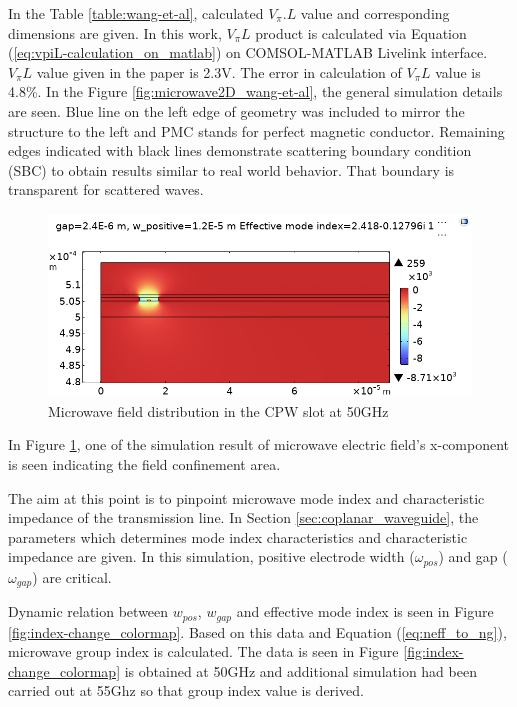     In the Table \ref{table:wang-et-al}, calculated $V_{\pi}.L$ value and corresponding dimensions are given. In this work, $V_\pi L$ product is calculated via Equation (\ref{eq:vpiL-calculation_on_matlab}) on COMSOL-MATLAB Livelink interface. $V_{\pi}L$ value given in the paper \cite{14} is 2.3V. The error in calculation of $V_{\pi}L$ value is 4.8\%. In the Figure \ref{fig:microwave2D_wang-et-al}, the general simulation details are seen. Blue line on the left edge of geometry was included to mirror the structure to the left and PMC stands for perfect magnetic conductor. Remaining edges indicated with black lines demonstrate scattering boundary condition (SBC) to obtain results similar to real world behavior. That boundary is transparent for scattered waves.
    
    
   	
	
	\begin{figure}[h!]
        \centering
        \includegraphics[width=0.8\linewidth]{field_overview_wpos_12um_gap_2.45um.png}
        \caption{Microwave field distribution in the CPW slot at 50GHz}
        \label{fig:cpw field distribution}
    \end{figure}
    
	In Figure \ref{fig:cpw field distribution}, one of the simulation result of microwave electric field's x-component is seen indicating the field confinement area. 	
	
	The aim at this point is to pinpoint microwave mode index and characteristic impedance of the transmission line. In Section \ref{sec:coplanar_waveguide}, the parameters which determines mode index characteristics and characteristic impedance are given. In this simulation, positive electrode width ($\omega _{pos}$) and gap ($\omega _{gap}$) are critical.
	

	Dynamic relation between $w_{pos}$, $w_{gap}$ and effective mode index is seen in Figure \ref{fig:index-change_colormap}. Based on this data and Equation (\ref{eq:neff_to_ng}), microwave group index is calculated. The data is seen in Figure \ref{fig:index-change_colormap} is obtained at 50GHz and additional simulation had been carried out at 55Ghz so that group index value is derived. 	
	
